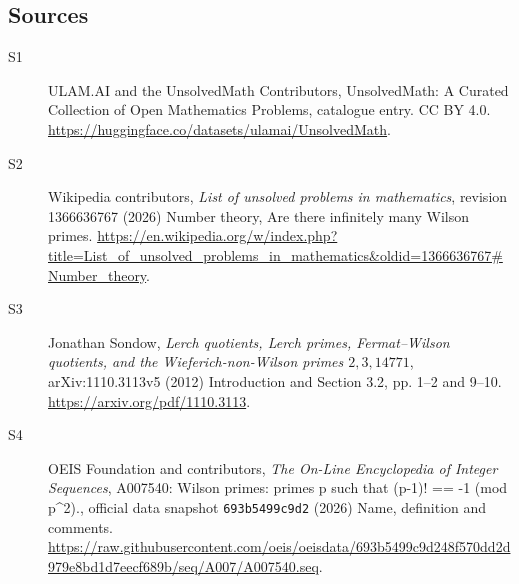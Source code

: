 \documentclass[11pt]{article}
\begin{document}
\subsection{Sources}
\begin{description}
\item[\hypertarget{source:statement:1}{S1}] ULAM.AI and the UnsolvedMath Contributors, UnsolvedMath: A Curated Collection of Open Mathematics Problems, catalogue entry. CC BY 4.0. \url{https://huggingface.co/datasets/ulamai/UnsolvedMath}.
\item[\hypertarget{source:statement:2}{S2}] Wikipedia contributors, \emph{List of unsolved problems in mathematics}, revision 1366636767 (2026) Number theory, Are there infinitely many Wilson primes. \url{https://en.wikipedia.org/w/index.php?title=List_of_unsolved_problems_in_mathematics&oldid=1366636767#Number_theory}.
\item[\hypertarget{source:statement:3}{S3}] Jonathan Sondow, \emph{Lerch quotients, Lerch primes, Fermat--Wilson quotients, and the Wieferich-non-Wilson primes $2,3,14771$}, arXiv:1110.3113v5 (2012) Introduction and Section 3.2, pp. 1--2 and 9--10. \url{https://arxiv.org/pdf/1110.3113}.
\item[\hypertarget{source:statement:4}{S4}] OEIS Foundation and contributors, \emph{The On-Line Encyclopedia of Integer Sequences}, A007540: Wilson primes: primes p such that (p-1)! == -1 (mod p\textasciicircum{}2)., official data snapshot \texttt{693b5499c9d2} (2026) Name, definition and comments. \url{https://raw.githubusercontent.com/oeis/oeisdata/693b5499c9d248f570dd2d979e8bd1d7eecf689b/seq/A007/A007540.seq}.
\end{description}
\label{end:statement}
\end{document}
